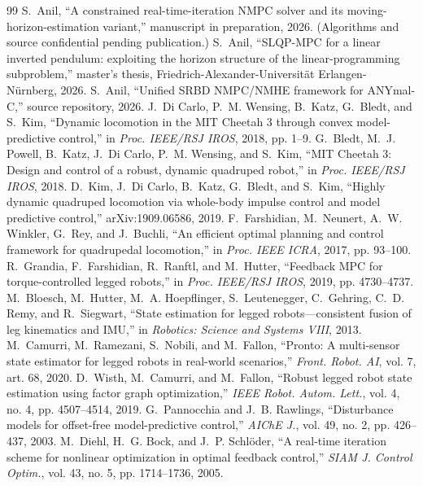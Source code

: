 \documentclass[11pt]{article}
\begin{document}
\begin{thebibliography}{99}\footnotesize
{} S.~Anil, ``A constrained real-time-iteration NMPC solver and its moving-horizon-estimation variant,'' manuscript in preparation, 2026. (Algorithms and source confidential pending publication.)
 S.~Anil, ``SLQP-MPC for a linear inverted pendulum: exploiting the horizon structure of the linear-programming subproblem,'' master's thesis, Friedrich-Alexander-Universit\"at Erlangen-N\"urnberg, 2026.
 S.~Anil, ``Unified SRBD NMPC/NMHE framework for ANYmal-C,'' source repository, 2026.
 J.~Di Carlo, P.~M. Wensing, B.~Katz, G.~Bledt, and S.~Kim, ``Dynamic locomotion in the MIT Cheetah 3 through convex model-predictive control,'' in \emph{Proc. IEEE/RSJ IROS}, 2018, pp. 1--9.
 G.~Bledt, M.~J. Powell, B.~Katz, J.~Di Carlo, P.~M. Wensing, and S.~Kim, ``MIT Cheetah 3: Design and control of a robust, dynamic quadruped robot,'' in \emph{Proc. IEEE/RSJ IROS}, 2018.
 D.~Kim, J.~Di Carlo, B.~Katz, G.~Bledt, and S.~Kim, ``Highly dynamic quadruped locomotion via whole-body impulse control and model predictive control,'' arXiv:1909.06586, 2019.
 F.~Farshidian, M.~Neunert, A.~W. Winkler, G.~Rey, and J.~Buchli, ``An efficient optimal planning and control framework for quadrupedal locomotion,'' in \emph{Proc. IEEE ICRA}, 2017, pp. 93--100.
 R.~Grandia, F.~Farshidian, R.~Ranftl, and M.~Hutter, ``Feedback MPC for torque-controlled legged robots,'' in \emph{Proc. IEEE/RSJ IROS}, 2019, pp. 4730--4737.
 M.~Bloesch, M.~Hutter, M.~A. Hoepflinger, S.~Leutenegger, C.~Gehring, C.~D. Remy, and R.~Siegwart, ``State estimation for legged robots---consistent fusion of leg kinematics and IMU,'' in \emph{Robotics: Science and Systems VIII}, 2013.
 M.~Camurri, M.~Ramezani, S.~Nobili, and M.~Fallon, ``Pronto: A multi-sensor state estimator for legged robots in real-world scenarios,'' \emph{Front. Robot. AI}, vol. 7, art. 68, 2020.
 D.~Wisth, M.~Camurri, and M.~Fallon, ``Robust legged robot state estimation using factor graph optimization,'' \emph{IEEE Robot. Autom. Lett.}, vol. 4, no. 4, pp. 4507--4514, 2019.
 G.~Pannocchia and J.~B. Rawlings, ``Disturbance models for offset-free model-predictive control,'' \emph{AIChE J.}, vol. 49, no. 2, pp. 426--437, 2003.
 M.~Diehl, H.~G. Bock, and J.~P. Schl\"oder, ``A real-time iteration scheme for nonlinear optimization in optimal feedback control,'' \emph{SIAM J. Control Optim.}, vol. 43, no. 5, pp. 1714--1736, 2005.

\end{thebibliography}
\end{document}

